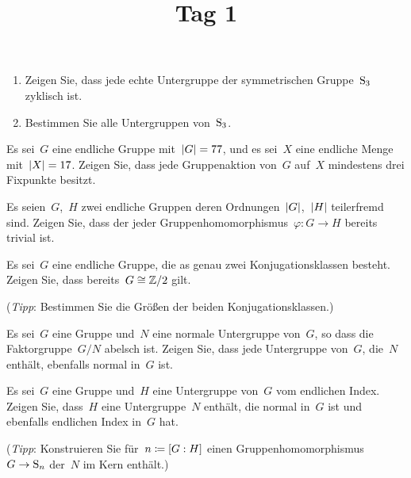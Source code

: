 \documentclass{scrartcl}
\title{Tag 1}
\author{}
\date{}
\begin{document}
\maketitle
\vspace{-6em}

\begin{exercise}
  \leavevmode
  \begin{enumerate}
    \item
      Zeigen Sie, dass jede echte Untergruppe der symmetrischen Gruppe~$\operatorname{S}_3$ zyklisch ist.
    \item
      Bestimmen Sie alle Untergruppen von~$\operatorname{S}_3$.
  \end{enumerate}
\end{exercise}

\begin{exercise}
  Es sei~$G$ eine endliche Gruppe mit~$\lvert G\rvert = 77$, und es sei~$X$ eine endliche Menge mit~$\lvert X\rvert = 17$.
  Zeigen Sie, dass jede Gruppenaktion von~$G$ auf~$X$ mindestens drei Fixpunkte besitzt.
\end{exercise}

\begin{exercise}
  Es seien~$G$,~$H$ zwei endliche Gruppen deren Ordnungen~$\lvert G\rvert$,~$\lvert H\rvert$ teilerfremd sind.
  Zeigen Sie, dass der jeder Gruppenhomomorphismus~$\varphi \colon G \to H$ bereits trivial ist.
\end{exercise}

\begin{exercise}
  Es sei~$G$ eine endliche Gruppe, die as genau zwei Konjugationsklassen besteht.
  Zeigen Sie, dass bereits~$G \cong \mathbb{Z}/2$ gilt.

  (\emph{Tipp}: Bestimmen Sie die Größen der beiden Konjugationsklassen.)
\end{exercise}

\begin{exercise}
  Es sei~$G$ eine Gruppe und~$N$ eine normale Untergruppe von~$G$, so dass die Faktorgruppe~$G/N$ abelsch ist.
  Zeigen Sie, dass jede Untergruppe von~$G$, die~$N$ enthält, ebenfalls normal in~$G$ ist.
\end{exercise}

\begin{exercise}
  Es sei~$G$ eine Gruppe und~$H$ eine Untergruppe von~$G$ vom endlichen Index.
  Zeigen Sie, dass~$H$ eine Untergruppe~$N$ enthält, die normal in~$G$ ist und ebenfalls endlichen Index in~$G$ hat.

  (\emph{Tipp}: Konstruieren Sie für~$n \coloneqq [G : H]$ einen Gruppenhomomorphismus~$G \to \Sym_n$ der~$N$ im Kern enthält.)
\end{exercise}
\end{document}
